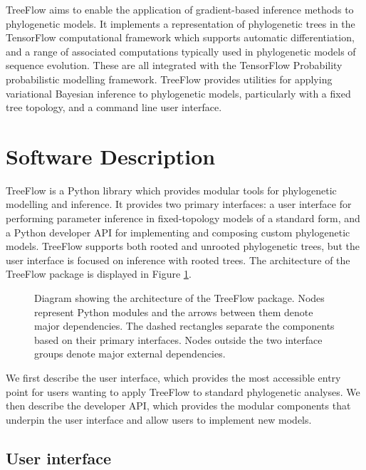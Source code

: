 TreeFlow aims to enable the application of gradient-based inference methods to phylogenetic models. It implements a representation of phylogenetic trees in the TensorFlow computational framework which supports automatic differentiation, and a range of associated computations typically used in phylogenetic models of sequence evolution. These are all integrated with the TensorFlow Probability probabilistic modelling framework. TreeFlow provides utilities for applying variational Bayesian inference to phylogenetic models, particularly with a fixed tree topology, and a command line user interface.

\section{Software Description}

TreeFlow is a Python library which provides modular tools for phylogenetic modelling and inference. It provides two primary interfaces: a user interface for performing parameter inference in fixed-topology models of a standard form, and a Python developer API for implementing and composing custom phylogenetic models. TreeFlow supports both rooted and unrooted phylogenetic trees, but the user interface is focused on inference with rooted trees. The architecture of the TreeFlow package is displayed in Figure \ref{fig:architecture}.

\newlength{\originalbaselineskip}
\setlength{\originalbaselineskip}{\baselineskip}

\begin{figure}
    \centering
    
    \caption{Diagram showing the architecture of the TreeFlow package. Nodes represent Python modules and the arrows between them denote major dependencies. The dashed rectangles separate the components based on their primary interfaces. Nodes outside the two interface groups denote major external dependencies.}
    \label{fig:architecture}
\end{figure}

\setlength{\baselineskip}{\originalbaselineskip}

We first describe the user interface, which provides the most accessible entry point for users wanting to apply TreeFlow to standard phylogenetic analyses. We then describe the developer API, which provides the modular components that underpin the user interface and allow users to implement new models.

\subsection{User interface}


